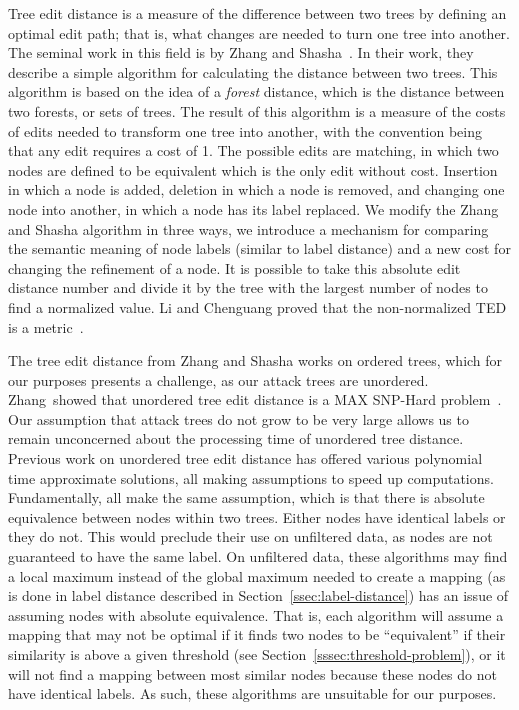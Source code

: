 Tree edit distance is a measure of the difference between two trees by defining an optimal edit path; that is, what changes are needed to turn one tree into another. The seminal work in this field is by Zhang and Shasha~\cite{Zhang_Shasha_1989}. In their work, they describe a simple algorithm for calculating the distance between two trees. This algorithm is based on the idea of a \textit{forest} distance, which is the distance between two forests, or sets of trees. The result of this algorithm is a measure of the costs of edits needed to transform one tree into another, with the convention being that any edit requires a cost of 1. The possible edits are matching, in which two nodes are defined to be equivalent which is the only edit without cost. Insertion in which a node is added, deletion in which a node is removed, and changing one node into another, in which a node has its label replaced. We modify the Zhang and Shasha algorithm in three ways, we introduce a mechanism for comparing the semantic meaning of node labels (similar to label distance) and a new cost for changing the refinement of a node. It is possible to take this absolute edit distance number and divide it by the tree with the largest number of nodes to find a normalized value. Li and Chenguang proved that the non-normalized TED is a metric~\cite{li2011metric}.

The tree edit distance from Zhang and Shasha works on ordered trees, which for our purposes presents a challenge, as our attack trees are unordered. Zhang~\etal showed that unordered tree edit distance is a MAX SNP-Hard problem~\cite{zhang_max_1994}. Our assumption that attack trees do not grow to be very large allows us to remain unconcerned about the processing time of unordered tree distance. Previous work on unordered tree edit distance has offered various polynomial time approximate solutions, all making assumptions to speed up computations. Fundamentally, all make the same assumption, which is that there is absolute equivalence between nodes within two trees. Either nodes have identical labels or they do not. This would preclude their use on unfiltered data, as nodes are not guaranteed to have the same label. On unfiltered data, these algorithms may find a local maximum instead of the global maximum needed to create a mapping (as is done in label distance described in Section~\ref{ssec:label-distance}) has an issue of assuming nodes with absolute equivalence. That is, each algorithm will assume a mapping that may not be optimal if it finds two nodes to be ``equivalent'' if their similarity is above a given threshold (see Section~\ref{sssec:threshold-problem}), or it will not find a mapping between most similar nodes because these nodes do not have identical labels. As such, these algorithms are unsuitable for our purposes.


